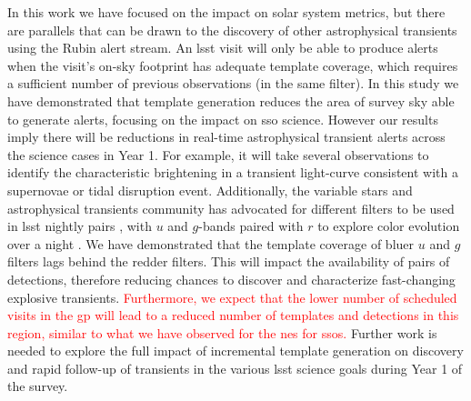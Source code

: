 \documentclass[preprintm,linenumbers]{aastex631}
\providecommand{\red}[1]{\textcolor{red}{#1}}
\begin{document}
		In this work we have focused on the impact on solar system metrics, but there are parallels that can be drawn to the discovery of other astrophysical transients using the Rubin alert stream. 
  An \gls*{lsst} visit will only be able to produce alerts when the visit's on-sky footprint has adequate template coverage, which requires a sufficient number of previous observations (in the same filter).
  In this study we have demonstrated that template generation reduces the area of survey sky able to generate alerts, %
  focusing on the impact on \gls*{sso} science.
  However our results imply there will be reductions in real-time astrophysical transient alerts across the science cases in Year 1.
  For example, it will take several observations to identify the characteristic brightening in a transient light-curve consistent with a supernovae or tidal disruption event. 
  Additionally, the variable stars and astrophysical transients community has advocated for different filters to be used in \gls*{lsst} nightly pairs \citep{2019PASPpresto}, with $u$ and $g$-bands paired with $r$ to explore color evolution over a night \citep{SCOC_Report_1, SCOC_Report_2}. 
  We have demonstrated that the template coverage of bluer $u$ and $g$ filters lags behind the redder filters.
  This will impact the availability of pairs of detections, therefore reducing chances to discover and characterize fast-changing explosive transients. 
  \red{Furthermore, we expect that the lower number of scheduled visits in the \gls*{gp} will lead to a reduced number of templates and detections in this region, similar to what we have observed for the \gls*{nes} for \glspl*{sso}.}
  Further work is needed to explore the full impact of incremental template generation on discovery and rapid follow-up of transients in the various \gls*{lsst} science goals during Year 1 of the survey. 
		
\end{document}

